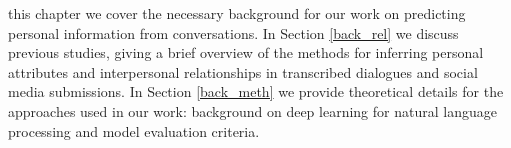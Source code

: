  this chapter we cover the necessary background for our work on predicting personal information from conversations. In Section \ref{back_rel} we discuss previous studies, giving a brief overview of the methods for inferring personal attributes and interpersonal relationships in transcribed dialogues and social media submissions. In Section \ref{back_meth} we provide theoretical details for the approaches used in our work: background on deep learning for natural language processing and model evaluation criteria.